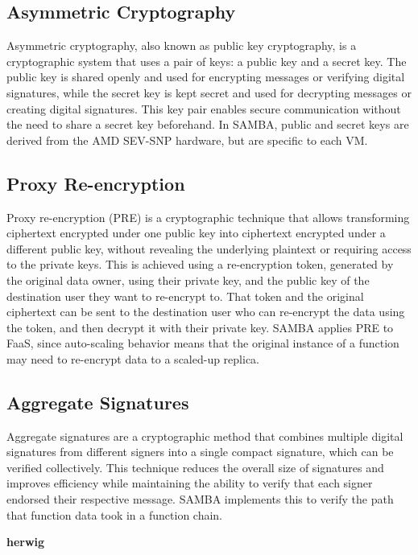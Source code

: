 \subsection{Asymmetric Cryptography}
Asymmetric cryptography, also known as public key cryptography, is a cryptographic system that uses a pair of keys: a public key and a secret key.
The public key is shared openly and used for encrypting messages or verifying digital signatures, while the secret key is kept secret and used for decrypting messages or creating digital signatures.
This key pair enables secure communication without the need to share a secret key beforehand.
In SAMBA, public and secret keys are derived from the AMD SEV-SNP hardware, but are specific to each VM.

\subsection{Proxy Re-encryption}
Proxy re-encryption (PRE) is a cryptographic technique that allows transforming ciphertext encrypted under one public key into ciphertext encrypted under a different public key, without revealing the underlying plaintext or requiring access to the private keys.
This is achieved using a re-encryption token, generated by the original data owner, using their private key, and the public key of the destination user they want to re-encrypt to.
That token and the original ciphertext can be sent to the destination user who can re-encrypt the data using the token, and then decrypt it with their private key.
SAMBA applies PRE to FaaS, since auto-scaling behavior means that the original instance of a function may need to re-encrypt data to a scaled-up replica.

\subsection{Aggregate Signatures}
Aggregate signatures are a cryptographic method that combines multiple digital signatures from different signers into a single compact signature, which can be verified collectively.
This technique reduces the overall size of signatures and improves efficiency while maintaining the ability to verify that each signer endorsed their respective message.
SAMBA implements this to verify the path that function data took in a function chain.

\textbf{herwig}

